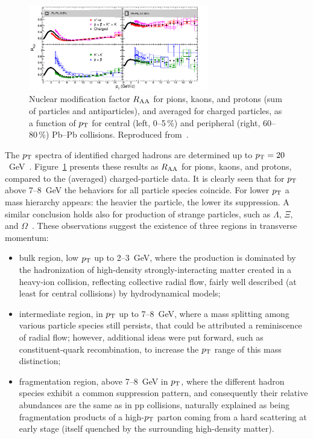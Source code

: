 \begin{figure}
\centering
\includegraphics[width=0.7\textwidth]{particlefigs/IdentHighPtRAA.pdf}
\caption{Nuclear modification factor $R_{\rm AA}$ for pions, kaons, and protons (sum of particles and antiparticles), and averaged for charged particles, as a function of $p_{\rm T}$ for central (left, 0--5\,\%) and peripheral (right, 60--80\,\%) Pb--Pb collisions. Reproduced from~\cite{ALICEIdentHighPtRAA}.}
\label{figks:IdentPartRAA}
\end{figure}

The $p_{\rm T}$ spectra of identified charged hadrons are determined up to $p_{\rm T} = 20$~GeV~\cite{ALICEIdentHighPtRAA}. Figure~\ref{figks:IdentPartRAA} presents these results as $R_{\rm AA}$ for pions, kaons, and protons, compared to the (averaged) charged-particle data. It is clearly seen that for $p_{\rm T}$ above 7--8~GeV the behaviors for all particle species coincide. For lower $p_{\rm T}$ a mass hierarchy appears: the heavier the particle, the lower its suppression. A similar conclusion holds also for production of strange particles, such as $\Lambda$, $\Xi$, and $\Omega$~\cite{ABELEV:2013zaa,Abelev:2013xaa}. These observations suggest the existence of three regions in transverse momentum:
\begin{itemize}
    \item{bulk region, low $p_{\rm T}$ up to 2--3~GeV, where the production is dominated by the hadronization of high-density strongly-interacting matter created in a heavy-ion collision, reflecting collective radial flow, fairly well described (at least for central collisions) by hydrodynamical models;}
    \item{intermediate region, in $p_{\rm T}$ up to 7--8~GeV, where a mass splitting among various particle species still persists, that could be attributed a reminiscence of radial flow; however, additional ideas were put forward, such as constituent-quark recombination, to increase the $p_{\rm T}$ range of this mass distinction;}
    \item{fragmentation region, above 7--8~GeV in $p_{\rm T}$, where the different hadron species exhibit a common suppression pattern, and consequently their relative abundances are the same as in pp collisions, naturally explained as being fragmentation products of a high-$p_{\rm T}$ parton coming from a hard scattering at early stage (itself quenched by the surrounding high-density matter).}
\end{itemize}

